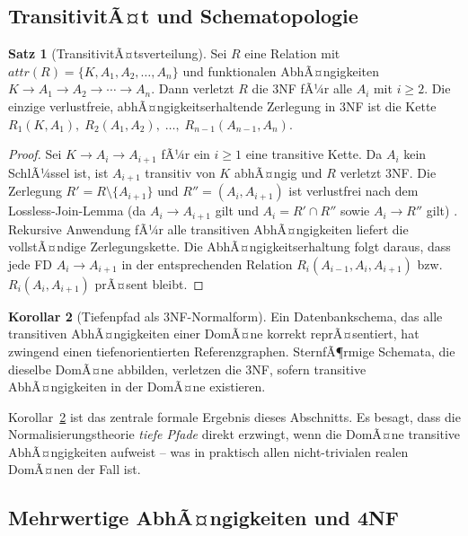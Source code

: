 ﻿\documentclass[a4paper,12pt]{report}
\theoremstyle{definition}
\newtheorem{theorem}{Satz}[chapter]
\newtheorem{corollary}[theorem]{Korollar}
\theoremstyle{remark}
\newcommand{\att}{\mathit{attr}}
\begin{document}
\subsection{TransitivitÃ¤t und Schematopologie}

\begin{theorem}[TransitivitÃ¤tsverteilung]
\label{thm:transitivitaet}
Sei $R$ eine Relation mit $\att(R) = \{K, A_1, A_2, \ldots, A_n\}$ und
funktionalen AbhÃ¤ngigkeiten $K \to A_1 \to A_2 \to \cdots \to A_n$.
Dann verletzt $R$ die 3NF fÃ¼r alle $A_i$ mit $i \geq 2$.
Die einzige verlustfreie, abhÃ¤ngigkeitserhaltende Zerlegung in 3NF ist
die Kette $R_1(K, A_1),\; R_2(A_1, A_2),\; \ldots,\; R_{n-1}(A_{n-1}, A_n)$.
\end{theorem}

\begin{proof}
Sei $K \to A_i \to A_{i+1}$ fÃ¼r ein $i \geq 1$ eine transitive Kette.
Da $A_i$ kein SchlÃ¼ssel ist, ist $A_{i+1}$ transitiv von $K$ abhÃ¤ngig und
$R$ verletzt 3NF. Die Zerlegung $R' = R \setminus \{A_{i+1}\}$ und
$R'' = (A_i, A_{i+1})$ ist verlustfrei nach dem Lossless-Join-Lemma
(da $A_i \to A_{i+1}$ gilt und $A_i = R' \cap R''$ sowie $A_i \to R''$ gilt)
\cite{Ullman1988}. Rekursive Anwendung fÃ¼r alle transitiven AbhÃ¤ngigkeiten
liefert die vollstÃ¤ndige Zerlegungskette. Die AbhÃ¤ngigkeitserhaltung folgt
daraus, dass jede FD $A_i \to A_{i+1}$ in der entsprechenden Relation
$R_i(A_{i-1}, A_i, A_{i+1})$ bzw.\ $R_i(A_i, A_{i+1})$ prÃ¤sent bleibt.
\end{proof}

\begin{corollary}[Tiefenpfad als 3NF-Normalform]
\label{cor:tiefenpfad3NF}
Ein Datenbankschema, das alle transitiven AbhÃ¤ngigkeiten einer DomÃ¤ne
korrekt reprÃ¤sentiert, hat zwingend einen tiefenorientierten Referenzgraphen.
SternfÃ¶rmige Schemata, die dieselbe DomÃ¤ne abbilden, verletzen die 3NF,
sofern transitive AbhÃ¤ngigkeiten in der DomÃ¤ne existieren.
\end{corollary}

Korollar~\ref{cor:tiefenpfad3NF} ist das zentrale formale Ergebnis dieses
Abschnitts. Es besagt, dass die Normalisierungstheorie \emph{tiefe Pfade}
direkt erzwingt, wenn die DomÃ¤ne transitive AbhÃ¤ngigkeiten aufweist --
was in praktisch allen nicht-trivialen realen DomÃ¤nen der Fall ist.

\subsection{Mehrwertige AbhÃ¤ngigkeiten und 4NF}
\end{document}
